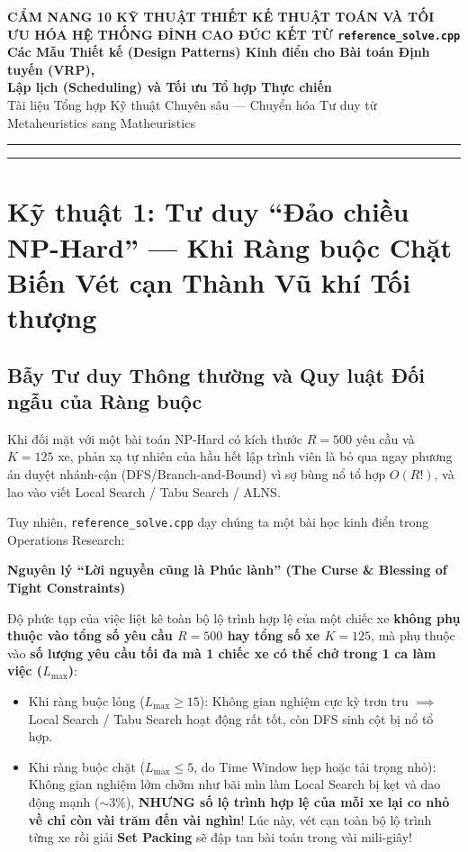 \documentclass[11pt,a4paper]{article}
\newenvironment{keybox}[1]{%
    \par\medskip\noindent
    \begin{lrbox}{\calloutbox}%
    \begin{minipage}{\dimexpr\linewidth-2\fboxsep-2\fboxrule\relax}
    \textbf{\textcolor{primaryblue}{#1}}\par\smallskip
}{%
    \end{minipage}%
    \end{lrbox}%
    \fcolorbox{primaryblue}{secondaryblue}{\usebox{\calloutbox}}%
    \par\medskip
}
\begin{document}
\begin{center}
    {\LARGE\bfseries\textcolor{primaryblue}{CẨM NANG 10 KỸ THUẬT THIẾT KẾ THUẬT TOÁN VÀ TỐI ƯU HÓA HỆ THỐNG ĐỈNH CAO ĐÚC KẾT TỪ \texttt{reference\_solve.cpp}}}\\[0.25cm]
    {\Large\bfseries Các Mẫu Thiết kế (Design Patterns) Kinh điển cho Bài toán Định tuyến (VRP),\\Lập lịch (Scheduling) và Tối ưu Tổ hợp Thực chiến}\\[0.35cm]
    {\normalsize Tài liệu Tổng hợp Kỹ thuật Chuyên sâu --- Chuyển hóa Tư duy từ Metaheuristics sang Matheuristics}\\[0.2cm]
    \rule{\linewidth}{1.2pt}
\end{center}

\tableofcontents
\vspace{0.4cm}
\rule{\linewidth}{0.5pt}
\newpage

\section{Kỹ thuật 1: Tư duy ``Đảo chiều NP-Hard'' --- Khi Ràng buộc Chặt Biến Vét cạn Thành Vũ khí Tối thượng}

\subsection{Bẫy Tư duy Thông thường và Quy luật Đối ngẫu của Ràng buộc}
Khi đối mặt với một bài toán NP-Hard có kích thước $R = 500$ yêu cầu và $K = 125$ xe, phản xạ tự nhiên của hầu hết lập trình viên là bỏ qua ngay phương án duyệt nhánh-cận (DFS/Branch-and-Bound) vì sợ bùng nổ tổ hợp $O(R!)$, và lao vào viết Local Search / Tabu Search / ALNS.

Tuy nhiên, \texttt{reference\_solve.cpp} dạy chúng ta một bài học kinh điển trong Operations Research:
\begin{keybox}{Nguyên lý ``Lời nguyền cũng là Phúc lành'' (The Curse \& Blessing of Tight Constraints)}
Độ phức tạp của việc liệt kê toàn bộ lộ trình hợp lệ của một chiếc xe \textbf{không phụ thuộc vào tổng số yêu cầu $R = 500$ hay tổng số xe $K = 125$}, mà phụ thuộc vào \textbf{số lượng yêu cầu tối đa mà 1 chiếc xe có thể chở trong 1 ca làm việc ($L_{\max}$)}:
\begin{itemize}[leftmargin=1.2em]
    \item Khi ràng buộc lỏng ($L_{\max} \ge 15$): Không gian nghiệm cực kỳ trơn tru $\implies$ Local Search / Tabu Search hoạt động rất tốt, còn DFS sinh cột bị nổ tổ hợp.
    \item Khi ràng buộc chặt ($L_{\max} \le 5$, do Time Window hẹp hoặc tải trọng nhỏ): Không gian nghiệm lởm chởm như bãi mìn làm Local Search bị kẹt và dao động mạnh ($\sim 3\%$), \textbf{NHƯNG số lộ trình hợp lệ của mỗi xe lại co nhỏ về chỉ còn vài trăm đến vài nghìn}! Lúc này, vét cạn toàn bộ lộ trình từng xe rồi giải \textbf{Set Packing} sẽ đập tan bài toán trong vài mili-giây!
\end{itemize}
\end{keybox}
\end{document}
